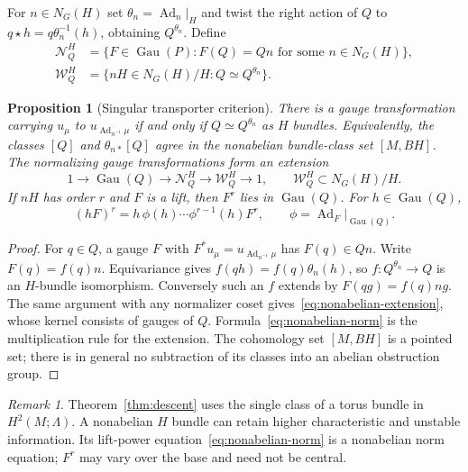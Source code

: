 \documentclass[11pt]{amsart}
\newcommand{\Ad}{\operatorname{Ad}}
\newcommand{\Gau}{\operatorname{Gau}}
\theoremstyle{plain}
\newtheorem{proposition}[theorem]{Proposition}
\theoremstyle{definition}
\theoremstyle{remark}
\newtheorem{remark}[theorem]{Remark}
\begin{document}
For $n\in N_G(H)$ set $\theta_n=\Ad_n|_H$ and twist the right action of $Q$ to $q\star h=q\theta_n^{-1}(h)$, obtaining $Q^{\theta_n}$.  Define
\[
 \begin{aligned}
 \mathcal N_Q^H&=\{F\in\Gau(P):F(Q)=Qn\text{ for some }n\in N_G(H)\},\\
 \mathcal W_Q^H&=\{nH\in N_G(H)/H:Q\simeq Q^{\theta_n}\}.
 \end{aligned}
\]

\begin{proposition}[Singular transporter criterion]\label{prop:singular}
There is a gauge transformation carrying $u_\mu$ to $u_{\Ad_{n^{-1}}\mu}$ if and only if $Q\simeq Q^{\theta_n}$ as $H$ bundles. Equivalently, the classes $[Q]$ and $\theta_{n*}[Q]$ agree in the nonabelian bundle-class set $[M,BH]$. The normalizing gauge transformations form an extension
\begin{equation}\label{eq:nonabelian-extension}
 1\longrightarrow\Gau(Q)\longrightarrow\mathcal N_Q^H
 \longrightarrow\mathcal W_Q^H\longrightarrow1,
 \qquad \mathcal W_Q^H\subset N_G(H)/H.
\end{equation}
If $nH$ has order $r$ and $F$ is a lift, then $F^r$ lies in $\Gau(Q)$. For $h\in\Gau(Q)$,
\begin{equation}\label{eq:nonabelian-norm}
 (hF)^r=h\,\phi(h)\cdots\phi^{r-1}(h)F^r,
 \qquad\phi=\operatorname{Ad}_F|_{\Gau(Q)}.
\end{equation}
\end{proposition}

\begin{proof}
For $q\in Q$, a gauge $F$ with $F^*u_\mu=u_{\Ad_{n^{-1}}\mu}$ has $F(q)\in Qn$. Write $F(q)=f(q)n$. Equivariance gives $f(qh)=f(q)\theta_n(h)$, so $f:Q^{\theta_n}\to Q$ is an $H$-bundle isomorphism. Conversely such an $f$ extends by $F(qg)=f(q)ng$. The same argument with any normalizer coset gives~\eqref{eq:nonabelian-extension}, whose kernel consists of gauges of $Q$. Formula~\eqref{eq:nonabelian-norm} is the multiplication rule for the extension. The cohomology set $[M,BH]$ is a pointed set; there is in general no subtraction of its classes into an abelian obstruction group.
\end{proof}

\begin{remark}
Theorem~\ref{thm:descent} uses the single class of a torus bundle in $H^2(M;\Lambda)$. A nonabelian $H$ bundle can retain higher characteristic and unstable information. Its lift-power equation~\eqref{eq:nonabelian-norm} is a nonabelian norm equation; $F^r$ may vary over the base and need not be central.
\end{remark}
\end{document}
